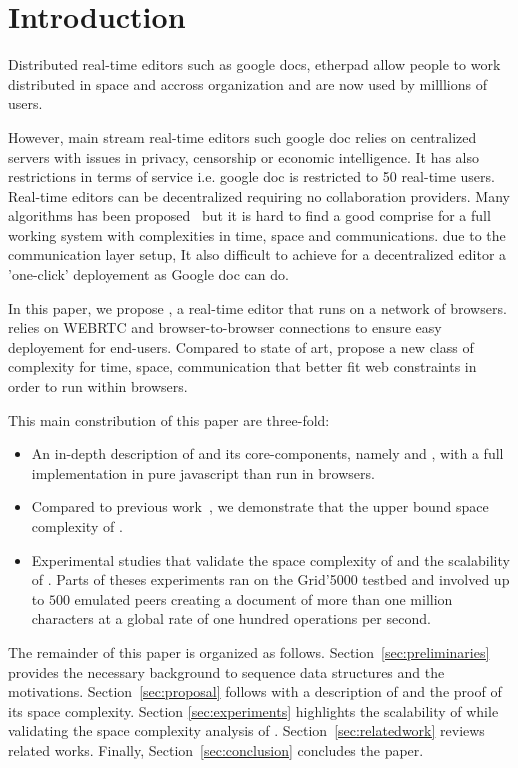
\section{Introduction}

Distributed real-time editors such as google docs, etherpad allow
people to work distributed in space and accross organization and are
now used by milllions of users. 

However, main stream real-time editors such google doc relies on
centralized servers with issues in privacy, censorship or economic
intelligence. It has also restrictions in terms of service i.e. google
doc is restricted to 50 real-time users. 
%
Real-time editors can be decentralized requiring no collaboration
providers. Many algorithms has been proposed~\cite{sun1998operational,
  sun2009contextbased,woot} but it is hard to find a good comprise for
a full working system with complexities in time, space and
communications. due to the communication layer setup, It also
difficult to achieve for a decentralized editor a 'one-click'
deployement as Google doc can do.

In this paper, we propose \CRATE, a real-time editor that runs on a
network of browsers. \CRATE relies on WEBRTC and browser-to-browser
connections to ensure easy deployement for end-users. Compared to
state of art, \CRATE propose a new class of complexity for time,
space, communication that better fit web constraints in order to run
within browsers.

This main constribution of this paper are three-fold:
\begin{itemize}
\item An in-depth description of \CRATE and its core-components,
  namely \LSEQ and \SPRAY, with a full implementation in pure
  javascript than run in browsers.
\item Compared to previous work~\cite{doceng}, we
  demonstrate that the upper bound space complexity of \CRATE.
\item Experimental studies that validate the space complexity of \LSEQ and the
  scalability of \CRATE. Parts of theses experiments ran on the Grid'5000
  testbed and involved up to $500$ emulated peers creating a document of more
  than one million characters at a global rate of one hundred operations per
  second.
\end{itemize}

The remainder of this paper is organized as
follows. Section~\ref{sec:preliminaries} provides the necessary background to
sequence data structures and the motivations. Section~\ref{sec:proposal}
follows with a description of \LSEQ and the proof of its space
complexity. Section \ref {sec:experiments} highlights the scalability of
\CRATE while validating the space complexity analysis of
\LSEQ. Section~\ref{sec:relatedwork} reviews related works. Finally,
Section~\ref{sec:conclusion} concludes the paper.




